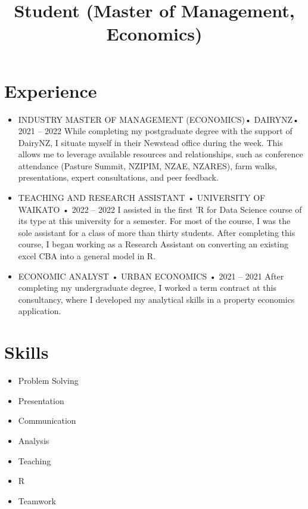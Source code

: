 \documentclass[11pt,a4paper,]{moderncv}
\title{Student (Master of Management, Economics)}
\providecommand{\tightlist}{%
	\setlength{\itemsep}{0pt}\setlength{\parskip}{0pt}}
\begin{document}
\makecvtitle



\hypertarget{experience}{%
\section{Experience}\label{experience}}

\begin{itemize}
\tightlist
\item
  INDUSTRY MASTER OF MANAGEMENT (ECONOMICS)• DAIRYNZ• 2021 -- 2022 While
  completing my postgraduate degree with the support of DairyNZ, I
  situate myself in their Newstead office during the week. This allows
  me to leverage available resources and relationships, such as
  conference attendance (Pasture Summit, NZIPIM, NZAE, NZARES), farm
  walks, presentations, expert consultations, and peer feedback.
\item
  TEACHING AND RESEARCH ASSISTANT • UNIVERSITY OF WAIKATO • 2022 -- 2022
  I assisted in the first 'R for Data Science course of its type at this
  university for a semester. For most of the course, I was the sole
  assistant for a class of more than thirty students. After completing
  this course, I began working as a Research Assistant on converting an
  existing excel CBA into a general model in R.
\item
  ECONOMIC ANALYST • URBAN ECONOMICS • 2021 -- 2021 After completing my
  undergraduate degree, I worked a term contract at this consultancy,
  where I developed my analytical skills in a property economics
  application.
\end{itemize}

\hypertarget{skills}{%
\section{Skills}\label{skills}}

\begin{itemize}
\tightlist
\item
  Problem Solving
\item
  Presentation
\item
  Communication
\item
  Analysis
\item
  Teaching
\item
  R
\item
  Teamwork
\end{itemize}
\end{document}
